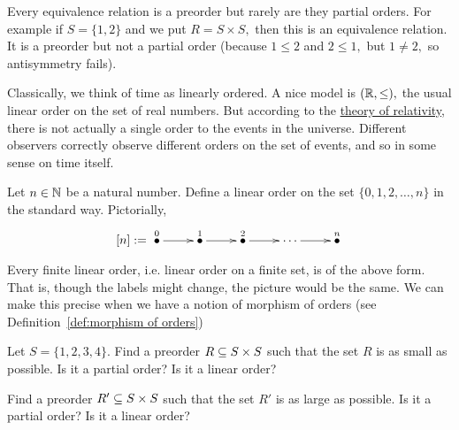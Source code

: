 \documentclass[../main/CT4S-EN-RU]{subfiles}
\begin{document}
\begin{exampleENG}
Every equivalence relation is a preorder but rarely are they partial orders. For example if $S=\{1,2\}$ and we put $R=S\times S,$ then this is an equivalence relation. It is a preorder but not a partial order (because $1\leq 2$ and $2\leq 1,$ but $1\neq 2,$ so antisymmetry fails).
\end{exampleENG}

\begin{exampleRUS}
\end{exampleRUS}

\begin{applicationENG}
Classically, we think of time as linearly ordered. A nice model is $(\RR,\leq),$ the usual linear order on the set of real numbers. But according to the \href{http://en.wikipedia.org/wiki/Relativity_of_simultaneity}{\text theory of relativity}, there is not actually a single order to the events in the universe. Different observers correctly observe different orders on the set of events, and so in some sense on time itself. 
\end{applicationENG}

\begin{applicationRUS}
\end{applicationRUS}

\begin{exampleENG}\label{ex:finite lo}
Let $n\in\NN$ be a natural number. Define a linear order on the set $\{0,1,2,\ldots,n\}$ in the standard way. Pictorially, 
$$
[n]:=\xymatrix{\LMO{0}\ar[r]&\LMO{1}\ar[r]&\LMO{2}\ar[r]&\cdots\ar[r]&\LMO{n}}
$$

Every finite linear order, i.e. linear order on a finite set, is of the above form. That is, though the labels might change, the picture would be the same. We can make this precise when we have a notion of morphism of orders (see Definition~\ref{def:morphism of orders})
\end{exampleENG}

\begin{exampleRUS}\label{ex:finite lo}
\end{exampleRUS}

\begin{exerciseENG}
Let $S=\{1,2,3,4\}.$ 
\sexc Find a preorder $R\ss S\times S$ such that the set $R$ is as small as possible. Is it a partial order? Is it a linear order?
\item Find a preorder $R'\ss S\times S$ such that the set $R'$ is as large as possible. Is it a partial order? Is it a linear order?
\endsexc
\end{exerciseENG}
\end{document}
